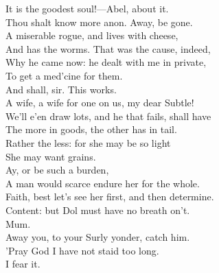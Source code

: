 \documentclass[a4paper,oneside]{memoir}
\begin{document}
\begin{drama*}
It is the goodest soul!---Abel, about it.\\
Thou shalt know more anon. Away, be gone.\\
A miserable rogue, and lives with cheese,\\
And has the worms. That was the cause, indeed,\\
Why he came now: he dealt with me in private,\\
To get a med'cine for them.\\
\subtlespeaks {} And shall, sir. This works.\\
\facespeaks A wife, a wife for one on us, my dear Subtle!\\
We'll e'en draw lots, and he that fails, shall have\\
The more in goods, the other has in tail.\\
\subtlespeaks Rather the less: for she may be so light\\
She may want grains.\\
\facespeaks {} Ay, or be such a burden,\\
A man would scarce endure her for the whole.\\
\subtlespeaks Faith, best let's see her first, and then determine.\\
\facespeaks Content: but Dol must have no breath on't.\\
\subtlespeaks {} Mum.\\
Away you, to your Surly yonder, catch him.\\
\facespeaks 'Pray God I have not staid too long.\\
\subtlespeaks {} I fear it.\\
\act

\scene


\end{drama*}
\end{document}
